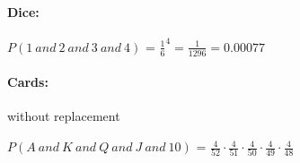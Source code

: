 \paragraph{Dice:}

$P(1 \ and \ 2 \ and \ 3 \ and \ 4)$ = $\frac{1}{6}^4= \frac{1}{1296} = 0.00077$



\paragraph{Cards:} without replacement

$P(A \ and \ K \ and \ Q \ and \ J \ and \ 10)$ = $\frac{4}{52}\cdot \frac{4}{51}\cdot \frac{4}{50}\cdot \frac{4}{49}\cdot \frac{4}{48} $


